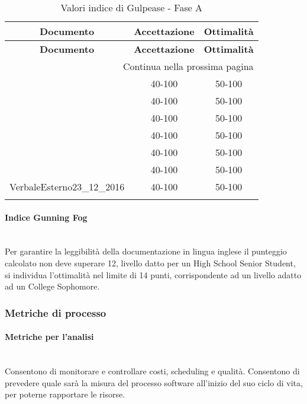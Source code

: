 \begin{longtable}{|c|c|c|}
	\hline \multicolumn{1}{|c|}{\textbf{Documento}} & \multicolumn{1}{c|}{\textbf{Accettazione}} & \multicolumn{1}{c|}{\textbf{Ottimalità}} \\
	\hline 
	\endfirsthead
	
	\hline \multicolumn{1}{|c|}{\textbf{Documento}} & \multicolumn{1}{c|}{\textbf{Accettazione}} & \multicolumn{1}{c|}{\textbf{Ottimalità}} \\
	\hline 
	\endhead
	
	\hline \multicolumn{3}{|r|}{{Continua nella prossima pagina}} \\ 
	\hline
	\endfoot
	
	\hline
	\endlastfoot
	
	\hline \NormeDiProgetto{}  & 40-100 & 50-100 \\
	\hline \StudioDiFattibilita{}  & 40-100 & 50-100  \\
	\hline \PianoDiProgetto{}  & 40-100 & 50-100  \\
	\hline \PianoDiQualifica{}  & 40-100 & 50-100  \\
	\hline \AnalisiDeiRequisiti{}  & 40-100 & 50-100  \\
	\hline \Glossario{}  & 40-100 & 50-100  \\
	\hline VerbaleEsterno23\_12\_2016 & 40-100 & 50-100 \\
	\hline
	\caption{Valori indice di Gulpease - Fase A}
\end{longtable}

\paragraph{Indice Gunning Fog}\mbox{}\\
Per garantire la leggibilità della documentazione in lingua inglese il punteggio calcolato non deve superare 12, livello datto per un High School Senior Student, si individua l'ottimalità nel limite di 14 punti, corrispondente ad un livello adatto ad un College Sophomore.

\subsubsection{Metriche di processo}\label{sec:metriche_processo}
\paragraph{Metriche per l'analisi}\mbox{}\\
Consentono di monitorare e controllare costi, scheduling e qualità. Consentono di prevedere quale sarà la misura del processo software all'inizio del suo ciclo di vita, per poterne rapportare le risorse.


